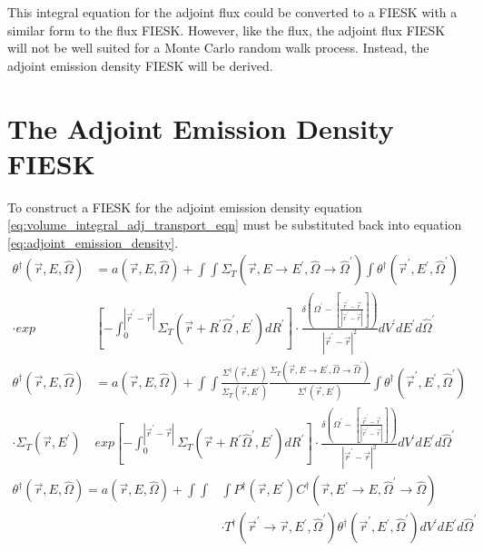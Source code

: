 This integral equation for the adjoint flux could be converted to a FIESK with
a similar form to the flux FIESK. However, like the flux, the adjoint flux
FIESK will not be well suited for a Monte Carlo random walk process. Instead,
the adjoint emission density FIESK will be derived.

\section{The Adjoint Emission Density FIESK}
To construct a FIESK for the adjoint emission density equation 
\ref{eq:volume_integral_adj_transport_eqn} must be substituted back into 
equation \ref{eq:adjoint_emission_density}. 
\begin{align}
  \theta^{\dagger}(\vec{r},E,\hat{\Omega}) & = a(\vec{r},E,\hat{\Omega}) +
  \int\int \Sigma_T(\vec{r},E \to E^{'},\hat{\Omega} \to \hat{\Omega}^{'})
  \int \theta^{\dagger}(\vec{r}^{'},E^{'},\hat{\Omega}^{'}) \nonumber \\
  \cdot exp&\left[-\int_0^{|\vec{r}^{'} - \vec{r}|} 
    \Sigma_T(\vec{r}+R^{'}\hat{\Omega}^{'},E^{'})dR^{'} \right]
  \cdot \frac{\delta \left(\Omega^{'} - \left[\frac{\vec{r}^{'} - \vec{r}}
      {|\vec{r}^{'} - \vec{r}|}\right]\right)}
        {|\vec{r}^{'} - \vec{r}|^2} dV^{'} dE^{'} d\hat{\Omega}^{'} \nonumber \\
        \theta^{\dagger}(\vec{r},E,\hat{\Omega}) & = a(\vec{r},E,\hat{\Omega}) +
        \int\int \frac{\Sigma^{\dagger}(\vec{r},E^{'})}{\Sigma_T(\vec{r},E^{'})}
        \frac{\Sigma_T(\vec{r},E \to E^{'},\hat{\Omega} \to \hat{\Omega}^{'})}
             {\Sigma^{\dagger}(\vec{r},E^{'})}
  \int \theta^{\dagger}(\vec{r}^{'},E^{'},\hat{\Omega}^{'}) \nonumber \\
  \cdot \Sigma_T(\vec{r},E^{'}) &exp\left[-\int_0^{|\vec{r}^{'} - \vec{r}|} 
    \Sigma_T(\vec{r}+R^{'}\hat{\Omega}^{'},E^{'})dR^{'} \right]
  \cdot \frac{\delta \left(\Omega^{'} - \left[\frac{\vec{r}^{'} - \vec{r}}
      {|\vec{r}^{'} - \vec{r}|}\right]\right)}
        {|\vec{r}^{'} - \vec{r}|^2} dV^{'} dE^{'} d\hat{\Omega}^{'} \nonumber
\end{align}
\begin{equation}
  \begin{split}
    \theta^{\dagger}(\vec{r},E,\hat{\Omega}) = a(\vec{r},E,\hat{\Omega}) + 
    \int\int&\int P^{\dagger}(\vec{r},E^{'})
    C^{\dagger}(\vec{r},E^{'} \to E,\hat{\Omega}^{'} \to \hat{\Omega}) \\
    & \cdot T^{\dagger}(\vec{r}^{'} \to \vec{r},E^{'},\hat{\Omega}^{'})
    \theta^{\dagger}(\vec{r}^{'},E^{'},\hat{\Omega}^{'})
    dV^{'} dE^{'} d\hat{\Omega}^{'}
  \end{split}
  \label{eq:adj_emission_dens_int_eqn}
\end{equation}

